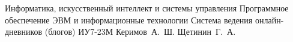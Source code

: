 \documentclass{bmstu-gost-7-32}
\begin{document}
\makecourseworktitle
	{Информатика, искусственный интеллект и системы управления} %
	{Программное обеспечение ЭВМ и информационные технологии} %
	{Система ведения онлайн-дневников (блогов)} %
	{ИУ7-23М} %
	{Керимов~А.~Ш.} %
	{Щетинин~Г.~А.} %
	{} %
	{} %

%
\setcounter{page}{3}
%
%

%
%


\begin{MainPart}
	
	
	
\end{MainPart}



%
\end{document}
